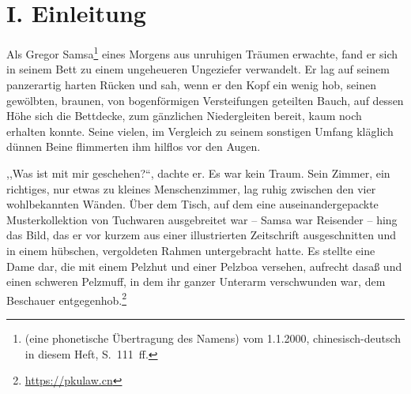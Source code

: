 \documentclass[]{zchinr}
\begin{document}

\printtitle

\section{I. Einleitung}

Als Gregor Samsa\footnote{ (eine phonetische Übertragung des Namens) vom 1.1.2000, chinesisch-deutsch in diesem Heft, S.~111~ff.} eines Morgens aus unruhigen Träumen erwachte, fand er sich in seinem Bett zu einem ungeheueren Ungeziefer verwandelt. Er lag auf seinem panzerartig harten Rücken und sah, wenn er den Kopf ein wenig hob, seinen gewölbten, braunen, von bogenförmigen Versteifungen geteilten Bauch, auf dessen Höhe sich die Bettdecke, zum gänzlichen Niedergleiten bereit, kaum noch erhalten konnte. Seine vielen, im Vergleich zu seinem sonstigen Umfang kläglich dünnen Beine flimmerten ihm hilflos vor den Augen.

,,Was ist mit mir geschehen?{}``, dachte er. Es war kein Traum. Sein Zimmer, ein richtiges, nur etwas zu kleines Menschenzimmer, lag ruhig zwischen den vier wohlbekannten Wänden. Über dem Tisch, auf dem eine auseinandergepackte Musterkollektion von Tuchwaren ausgebreitet war -- Samsa war Reisender -- hing das Bild, das er vor kurzem aus einer illustrierten Zeitschrift ausgeschnitten und in einem hübschen, vergoldeten Rahmen untergebracht hatte. Es stellte eine Dame dar, die mit einem Pelzhut und einer Pelzboa versehen, aufrecht dasaß und einen schweren Pelzmuff, in dem ihr ganzer Unterarm verschwunden war, dem Beschauer entgegenhob.\footnote{\url{https://pkulaw.cn}}
\end{document}
